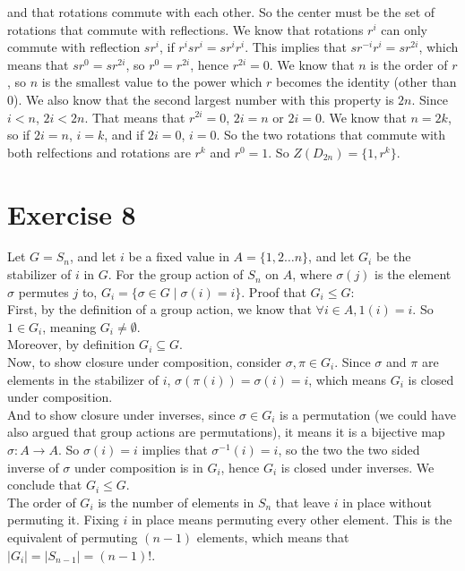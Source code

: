 \documentclass{article}
\begin{document}
\begin{enumerate}[label=\textbf{\alph*.}]
            and that rotations commute with each other.
            So the center must be the set of rotations that commute with
            reflections.
            We know that rotations $r^i$ can only commute with
            reflection $sr^i$,
            if $r^isr^i = sr^ir^i$.
            This implies that $sr^{-i}r^i = sr^{2i}$,
            which means that $sr^{0} = sr^{2i}$,
            so $r^{0} = r^{2i}$,
            hence $r^{2i} = 0$.
            We know that $n$ is the order of $r$,
            so $n$ is the smallest value to the power which $r$
            becomes the identity (other than 0).
            We also know that the second largest number with this
            property is $2n$.
            Since $i < n$, $2i < 2n$.
            That means that $r^{2i} = 0$, $2i = n$ or $2i = 0$.
            We know that $n = 2k$, so if $2i = n$, $i = k$,
            and if $2i = 0$, $i = 0$.
            So the two rotations that commute with both relfections
            and rotations are $r^k$ and $r^0 = 1$.
            So $Z(D_{2n}) = \{1, r^k\}$.
    \end{enumerate}


    \section*{Exercise 8}
    Let $G = S_n$, and let $i$ be a fixed value in $A = \{1, 2 \dots n\}$,
    and let $G_i$ be the stabilizer of $i$ in $G$.
    For the group action of $S_n$ on $A$, where $\sigma(j)$
    is the element $\sigma$ permutes $j$ to,
    $G_i = \{\sigma \in G \mid \sigma(i) = i\}$.
    Proof that $G_i \leqslant G$: \\
    First, by the definition of a group action,
    we know that $\forall i \in A, 1(i) = i$.
    So $1 \in G_i$,
    meaning $G_i \neq \emptyset$. \\
    Moreover, by definition $G_i \subseteq G$. \\
    Now, to show closure under composition,
    consider $\sigma, \pi \in G_i$.
    Since $\sigma$ and $\pi$ are elements in the stabilizer of $i$,
    $\sigma(\pi(i)) = \sigma(i) = i$,
    which means $G_i$ is closed under composition. \\
    And to show closure under inverses,
    since $\sigma \in G_i$ is a permutation
    (we could have also argued that group actions are permutations),
    it means it is a bijective map $\sigma: A \to A$.
    So $\sigma(i) = i$ implies that $\sigma^{-1}(i) = i$,
    so the two the two sided inverse of $\sigma$ under composition
    is in $G_i$,
    hence $G_i$ is closed under inverses.
    We conclude that $G_i \leqslant G$. \\
    The order of $G_i$ is the number of elements in $S_n$
    that leave $i$ in place without permuting it.
    Fixing $i$ in place means permuting every other element.
    This is the equivalent of permuting $(n-1)$ elements,
    which means that $|G_i| = |S_{n-1}| = (n-1)!$.
\end{document}
